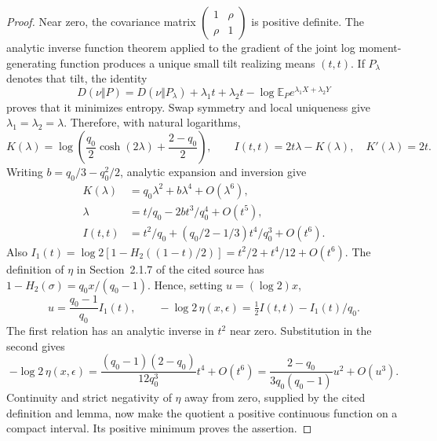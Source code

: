 \begin{proof}
Near zero, the covariance matrix
$\left(\begin{smallmatrix}1&\rho\\\rho&1\end{smallmatrix}\right)$
is positive definite. The analytic inverse function theorem applied to
the gradient of the joint log moment-generating function produces a unique
small tilt realizing means $(t,t)$. If $P_\lambda$ denotes that tilt,
the identity
\[
 D(\nu\Vert P)=D(\nu\Vert P_\lambda)
  +\lambda_1t+\lambda_2t-\log\mathbb E_Pe^{\lambda_1X+\lambda_2Y}
\]
proves that it minimizes entropy. Swap symmetry and local uniqueness
give $\lambda_1=\lambda_2=\lambda$. Therefore, with natural logarithms,
\[
 K(\lambda)=\log\left(\frac{q_0}{2}\cosh(2\lambda)
                          +\frac{2-q_0}{2}\right),\qquad
 I(t,t)=2t\lambda-K(\lambda),\quad K'(\lambda)=2t.
\]
Writing $b=q_0/3-q_0^2/2$, analytic expansion and inversion give
\begin{align*}
 K(\lambda)&=q_0\lambda^2+b\lambda^4+O(\lambda^6),\\
 \lambda&=t/q_0-2bt^3/q_0^4+O(t^5),\\
 I(t,t)&=t^2/q_0+(q_0/2-1/3)t^4/q_0^3+O(t^6).
\end{align*}
Also $I_1(t)=\log2[1-H_2((1-t)/2)]=t^2/2+t^4/12+O(t^6)$.
The definition of $\eta$ in Section~2.1.7 of the cited source has
$1-H_2(\sigma)=q_0x/(q_0-1)$. Hence, setting $u=(\log2)x$,
\[
 u=\frac{q_0-1}{q_0}I_1(t),\qquad
 -\log2\,\eta(x,\epsilon)=\tfrac12 I(t,t)-I_1(t)/q_0.
\]
The first relation has an analytic inverse in $t^2$ near zero. Substitution
in the second gives
\[
 -\log2\,\eta(x,\epsilon)
 =\frac{(q_0-1)(2-q_0)}{12q_0^3}t^4+O(t^6)
 =\frac{2-q_0}{3q_0(q_0-1)}u^2+O(u^3).
\]
Continuity and strict negativity of $\eta$ away from zero, supplied by
the cited definition and lemma, now make the quotient a positive
continuous function on a compact interval. Its positive minimum proves
the assertion.
\end{proof}

